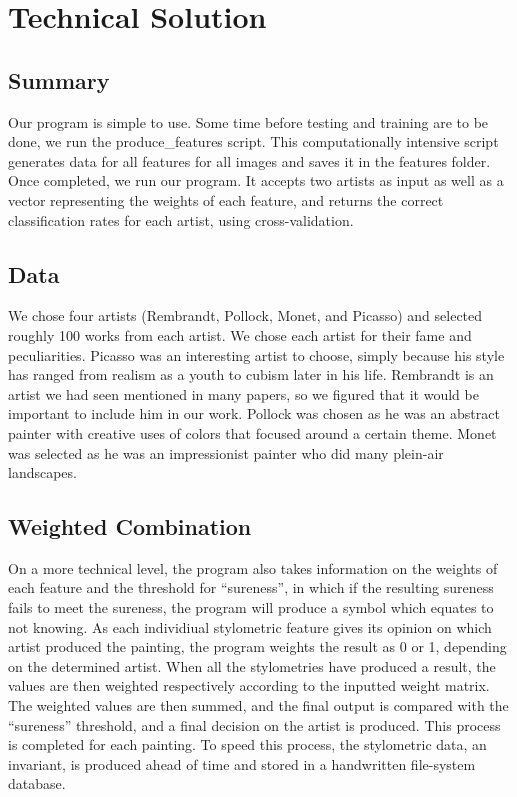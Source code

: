\documentclass{article}
\begin{document}
  \section{Technical Solution}
  \subsection{Summary}
  Our program is simple to use. Some time before testing and training are to be
  done, we run the produce\_features script. This computationally intensive
  script generates data for all features for all images and saves it in the
  features folder. Once completed, we run our program. It accepts two artists as
  input as well as a vector representing the weights of each feature, and
  returns the correct classification rates for each artist, using
  cross-validation.

  \subsection{Data}
  We chose four artists (Rembrandt, Pollock, Monet, and Picasso) and selected
  roughly 100 works from each artist. We chose each artist for their fame and
  peculiarities. Picasso was an interesting artist to choose, simply because his
  style has ranged from realism as a youth to cubism later in his life.
  Rembrandt is an artist we had seen mentioned in many papers, so we figured
  that it would be important to include him in our work. Pollock was chosen as
  he was an abstract painter with creative uses of colors that focused around a
  certain theme. Monet was selected as he was an impressionist painter who did
  many plein-air landscapes.

  \subsection{Weighted Combination}
  On a more technical level, the program also takes information on the weights
  of each feature and the threshold for ``sureness'', in which if the resulting
  sureness fails to meet the sureness, the program will produce a symbol which
  equates to not knowing. As each individiual stylometric feature gives its
  opinion on which artist produced the painting, the program weights the result
  as 0 or 1, depending on the determined artist. When all the stylometries have
  produced a result, the values are then weighted respectively according to the
  inputted weight matrix. The weighted values are then summed, and the final
  output is compared with the ``sureness'' threshold, and a final decision on
  the artist is produced. This process is completed for each painting. To speed
  this process, the stylometric data, an invariant, is produced ahead of time
  and stored in a handwritten file-system database. \\
\end{document}
